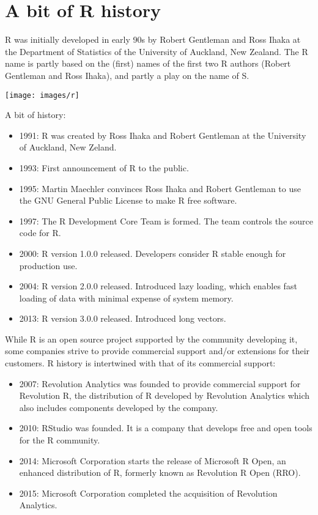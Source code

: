 \documentclass[]{book}
\providecommand{\tightlist}{%
  \setlength{\itemsep}{0pt}\setlength{\parskip}{0pt}}
\def\tightlist{}
\begin{document}
\section{A bit of R history}\label{a-bit-of-r-history}

R was initially developed in early 90s by Robert Gentleman and Ross
Ihaka at the Department of Statistics of the University of Auckland, New
Zealand. The R name is partly based on the (first) names of the first
two R authors (Robert Gentleman and Ross Ihaka), and partly a play on
the name of S.

\begin{center}\texttt{[image: images/r]} \end{center}

A bit of history:

\begin{itemize}
\tightlist
\item
  1991: R was created by Ross Ihaka and Robert Gentleman at the
  University of Auckland, New Zeland.
\item
  1993: First announcement of R to the public.
\item
  1995: Martin Maechler convinces Ross Ihaka and Robert Gentleman to use
  the GNU General Public License to make R free software.
\item
  1997: The R Development Core Team is formed. The team controls the
  source code for R.
\item
  2000: R version 1.0.0 released. Developers consider R stable enough
  for production use.
\item
  2004: R version 2.0.0 released. Introduced lazy loading, which enables
  fast loading of data with minimal expense of system memory.
\item
  2013: R version 3.0.0 released. Introduced long vectors.
\end{itemize}

While R is an open source project supported by the community developing
it, some companies strive to provide commercial support and/or
extensions for their customers. R history is intertwined with that of
its commercial support:

\begin{itemize}
\tightlist
\item
  2007: Revolution Analytics was founded to provide commercial support
  for Revolution R, the distribution of R developed by Revolution
  Analytics which also includes components developed by the company.
\item
  2010: RStudio was founded. It is a company that develops free and open
  tools for the R community.
\item
  2014: Microsoft Corporation starts the release of Microsoft R Open, an
  enhanced distribution of R, formerly known as Revolution R Open (RRO).
\item
  2015: Microsoft Corporation completed the acquisition of Revolution
  Analytics.
\end{itemize}
\end{document}
